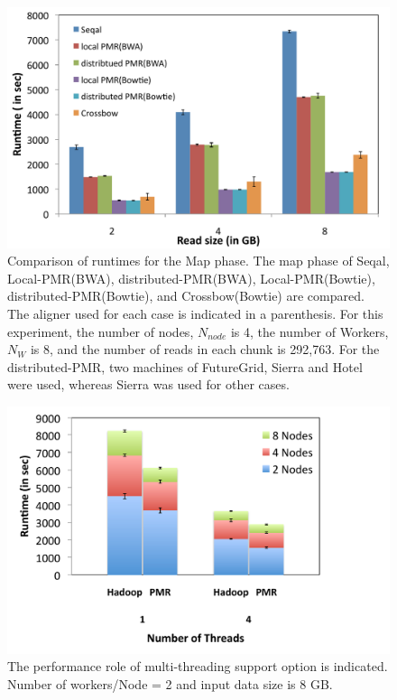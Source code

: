 \documentclass{acm_proc_article-sp}
\begin{document}
\begin{figure} 
 \centering
\includegraphics[scale=0.40]{figures/map_comp.pdf}
\caption{\small  Comparison of runtimes for the Map phase. The map phase of Seqal, Local-PMR(BWA), distributed-PMR(BWA), Local-PMR(Bowtie), distributed-PMR(Bowtie), and Crossbow(Bowtie) are compared.  The aligner used for each case is indicated in a parenthesis.  For this experiment, the number of nodes, $N_{node}$ is 4, the number of Workers, $N_W$ is 8, and the number of reads in each chunk is 292,763.  For the distributed-PMR, two machines of FutureGrid, Sierra and Hotel were used, whereas Sierra was used for other cases.}
  \label{fig:tool_comp} 
\end{figure}





\begin{figure} 
 \centering
\includegraphics[scale=0.46]{figures/fig6_t.pdf}
\caption{\small The performance role of multi-threading support option is indicated.  Number of workers/Node = 2 and input data size is 8 GB.}
  \label{fig:mulit-parallel} 
\end{figure}
\end{document}

